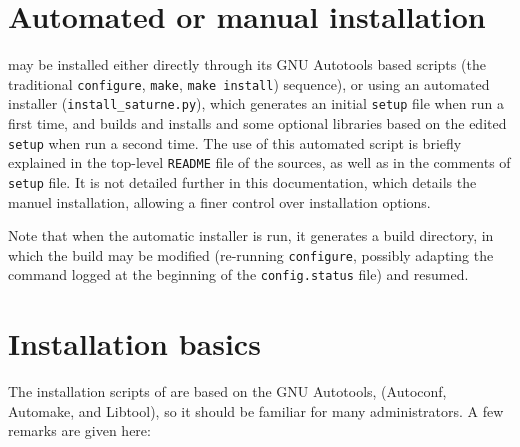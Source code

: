 \documentclass[a4paper,10pt,twoside]{csshortdoc}
\begin{document}
\def\contentsname{\textbf{\normalsize TABLE OF CONTENTS}\pdfbookmark[1]{Table of
contents}{contents}}

\renewcommand{\logocs}{cs_logo_wire_black}

\large
\makepdgCS
\normalsize

\passepage

\begin{center}\begin{singlespace}
\tableofcontents
\end{singlespace}\end{center}

\section{\CS Automated or manual installation\label{sec:inst_types}}

\CS may be installed either directly through its GNU Autotools based
scripts (the traditional \texttt{configure}, \texttt{make}, \texttt{make install})
sequence), or using an automated installer (\texttt{install\_saturne.py}),
which generates an initial \texttt{setup} file when run a first time,
and builds and installs \CS and some optional libraries based on the
edited \texttt{setup} when run a second time. The use of this automated script
is briefly explained in the top-level \texttt{README} file of the \CS
sources, as well as in the comments of \texttt{setup} file. It is not detailed
further in this documentation, which details the manuel installation, allowing
a finer control over installation options.

Note that when the automatic installer is run, it generates a build directory,
in which the build may be modified (re-running \texttt{configure}, possibly
adapting the command logged at the beginning of the \texttt{config.status}
file) and resumed.

\section{Installation basics\label{sec:install_basics}}

The installation scripts of \CS are based on the GNU Autotools,
(Autoconf, Automake, and Libtool), so it should be familiar for many
administrators. A few remarks are given here:
\end{document}
